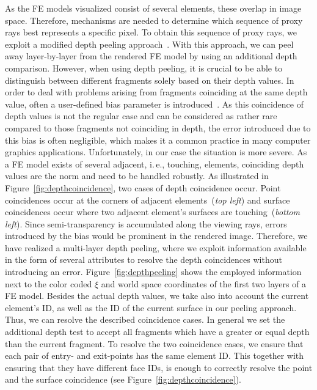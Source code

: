 \documentclass[journal]{vgtc}                %
\begin{document}
As the FE models visualized consist of several elements, these overlap in image space. Therefore, mechanisms are needed to determine which sequence of proxy rays best represents a specific pixel. To obtain this sequence of proxy rays, we exploit a modified depth peeling approach~\cite{mammen89DepthPeeling}. With this approach, we can peel away layer-by-layer from the rendered FE model by using an additional depth comparison. However, when using depth peeling, it is crucial to be able to distinguish between different fragments solely based on their depth values. In order to deal with problems arising from fragments coinciding at the same depth value, often a user-defined bias parameter is introduced~\cite{Everitt01interactiveorder-independent}. As this coincidence of depth values is not the regular case and can be considered as rather rare compared to those fragments not coinciding in depth, the error introduced due to this bias is often negligible, which makes it a common practice in many computer graphics applications. Unfortunately, in our case the situation is more severe. As a FE model exists of several adjacent, i.\,e., touching, elements, coinciding depth values are the norm and need to be handled robustly. As illustrated in Figure~\ref{fig:depthcoincidence}, two cases of depth coincidence occur. Point coincidences occur at the corners of adjacent elements~({\it top left}) and surface coincidences occur where two adjacent element's surfaces are touching~({\it bottom left}). Since semi-transparency is accumulated along the viewing rays, errors introduced by the bias would be prominent in the rendered image. Therefore, we have realized a multi-layer depth peeling, where we exploit information available in the form of several attributes to resolve the depth coincidences without introducing an error. Figure~\ref{fig:depthpeeling} shows the employed information next to the color coded $\xi$ and world space coordinates of the first two layers of a FE model. Besides the actual depth values, we take also into account the current element's ID, as well as the ID of the current surface in our peeling approach. Thus, we can resolve the described coincidence cases. In general we set the additional depth test to accept all fragments which have a greater or equal depth than the current fragment. To resolve the two coincidence cases, we ensure that each pair of entry- and exit-points has the same element ID. This together with ensuring that they have different face IDs, is enough to correctly resolve the point and the surface coincidence (see Figure~\ref{fig:depthcoincidence}).
\end{document}

